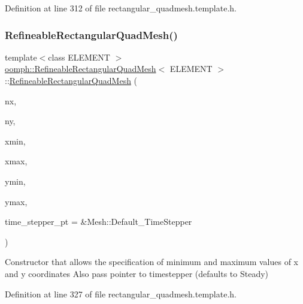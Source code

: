 Definition at line 312 of file rectangular\+\_\+quadmesh.\+template.\+h.

\mbox{\label{classoomph_1_1RefineableRectangularQuadMesh_ad4e8f11be4917fe7eeb9de2213a98f7b}} 
\subsubsection{\texorpdfstring{Refineable\+Rectangular\+Quad\+Mesh()}{RefineableRectangularQuadMesh()}\hspace{0.1cm}{\footnotesize\ttfamily [3/4]}}
{\footnotesize\ttfamily template$<$class E\+L\+E\+M\+E\+NT $>$ \\
\hyperlink{classoomph_1_1RefineableRectangularQuadMesh}{oomph\+::\+Refineable\+Rectangular\+Quad\+Mesh}$<$ E\+L\+E\+M\+E\+NT $>$\+::\hyperlink{classoomph_1_1RefineableRectangularQuadMesh}{Refineable\+Rectangular\+Quad\+Mesh} (\begin{DoxyParamCaption}\item[{const unsigned \&}]{nx,  }\item[{const unsigned \&}]{ny,  }\item[{const double \&}]{xmin,  }\item[{const double \&}]{xmax,  }\item[{const double \&}]{ymin,  }\item[{const double \&}]{ymax,  }\item[{Time\+Stepper $\ast$}]{time\+\_\+stepper\+\_\+pt = {\ttfamily \&Mesh\+:\+:Default\+\_\+TimeStepper} }\end{DoxyParamCaption})\hspace{0.3cm}{\ttfamily [inline]}}



Constructor that allows the specification of minimum and maximum values of x and y coordinates Also pass pointer to timestepper (defaults to Steady) 



Definition at line 327 of file rectangular\+\_\+quadmesh.\+template.\+h.

\mbox{\label{classoomph_1_1RefineableRectangularQuadMesh_a4d9b146956f5b6c4df25afe9cb2a6e96}} 
